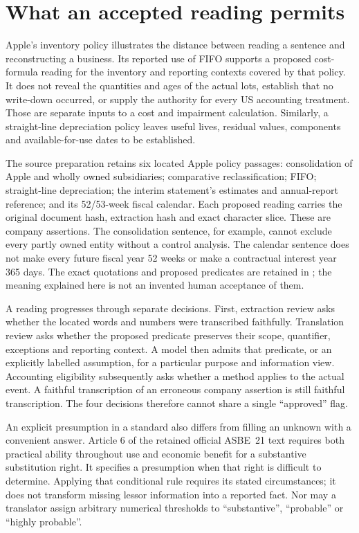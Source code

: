\section{What an accepted reading permits}
\label{sec:source-admission}

Apple's inventory policy illustrates the distance between reading a sentence
and reconstructing a business. Its reported use of FIFO supports a proposed
cost-formula reading for the inventory and reporting contexts covered by that
policy. It does not reveal the quantities and ages of the actual lots, establish
that no write-down occurred, or supply the authority for every US accounting
treatment. Those are separate inputs to a cost and impairment calculation.
Similarly, a straight-line depreciation policy leaves useful lives, residual
values, components and available-for-use dates to be established.

The source preparation retains six located Apple policy passages: consolidation
of Apple and wholly owned subsidiaries; comparative reclassification; FIFO;
straight-line depreciation; the interim statement's estimates and annual-report
reference; and its 52/53-week fiscal calendar. Each proposed reading carries
the original document hash, extraction hash and exact character slice. These
are company assertions. The consolidation sentence, for example, cannot exclude
every partly owned entity without a control analysis. The calendar sentence
does not make every future fiscal year 52 weeks or make a contractual interest
year 365 days. The exact quotations and proposed predicates are retained in
; the meaning explained here is
not an invented human acceptance of them.

A reading progresses through separate decisions. First, extraction review asks
whether the located words and numbers were transcribed faithfully. Translation
review asks whether the proposed predicate preserves their scope, quantifier,
exceptions and reporting context. A model then admits that predicate, or an
explicitly labelled assumption, for a particular purpose and information view.
Accounting eligibility subsequently asks whether a method applies to the actual
event. A faithful transcription of an erroneous company assertion is still
faithful transcription. The four decisions therefore cannot share a single
``approved'' flag.

An explicit presumption in a standard also differs from filling an unknown with
a convenient answer. Article 6 of the retained official ASBE~21 text requires
both practical ability throughout use and economic benefit for a substantive
substitution right. It specifies a presumption when that right is difficult to
determine. Applying that conditional rule requires its stated circumstances;
it does not transform missing lessor information into a reported fact. Nor may
a translator assign arbitrary numerical thresholds to ``substantive'',
``probable'' or ``highly probable''.

